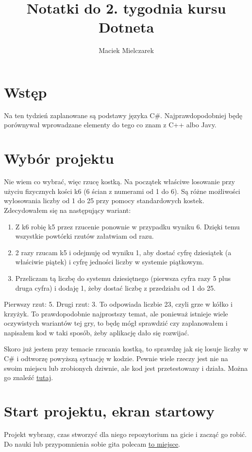 \documentclass[10pt]{article}
\title{Notatki do 2. tygodnia kursu Dotneta}
\author{Maciek Mielczarek}
\begin{document}
\maketitle

\section{Wstęp}
Na ten tydzień zaplanowane są podstawy języka C\#. Najprawdopodobniej będę porównywał wprowadzane elementy do tego co znam z C++ albo Javy.

\section{Wybór projektu}
Nie wiem co wybrać, więc rzucę kostką. Na początek właściwe losowanie przy użyciu fizycznych kości k6 (6 ścian z numerami od 1 do 6). Są różne możliwości wylosowania liczby od 1 do 25 przy pomocy standardowych kostek. Zdecydowałem się na następujący wariant:
\begin{enumerate}
\item Z k6 robię k5 przez rzucenie ponownie w przypadku wyniku 6. Dzięki temu wszystkie powtórki rzutów załatwiam od razu.
\item 2 razy rzucam k5 i odejmuję od wyniku 1, aby dostać cyfrę dziesiątek (a właściwie piątek) i cyfrę jedności liczby w systemie piątkowym.
\item Przeliczam tą liczbę do systemu dziesiętnego (pierwsza cyfra razy 5 plus druga cyfra) i dodaję 1, żeby dostać liczbę z przedziału od 1 do 25.
\end{enumerate}

Pierwszy rzut: 5. Drugi rzut: 3. To odpowiada liczbie 23, czyli grze w kółko i krzyżyk. To prawdopodobnie najprostszy temat, ale ponieważ istnieje wiele oczywistych wariantów tej gry, to będę mógł sprawdzić czy zaplanowałem i napisałem kod w taki sposób, żeby aplikację dało się rozwijać.

Skoro już jestem przy temacie rzucania kostką, to sprawdzę jak się losuje liczby w C\# i odtworzę powyższą sytuację w kodzie. Pewnie wiele rzeczy jest nie na swoim miejscu lub zrobionych dziwnie, ale kod jest przetestowany i działa. Można go znaleźć \href{https://github.com/maciej-marek-mielczarek/kurs-dotneta/tree/master/tydzien\_02/Dices}{tutaj}.

\section{Start projektu, ekran startowy}
Projekt wybrany, czas stworzyć dla niego repozytorium na gicie i zacząć go robić. Do nauki lub przypomnienia sobie gita polecam \href{https://learngitbranching.js.org/}{to miejsce}.
\end{document}
